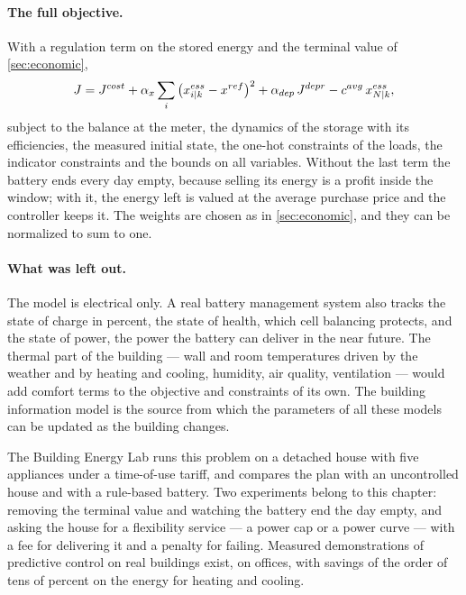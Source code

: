 \paragraph{The full objective.} With a regulation term on the stored energy and the terminal
value of \cref{sec:economic},
\begin{equation}
  J = J^{cost} + \alpha_x \sum_{i}\big(x^{ess}_{{i|k}} - x^{ref}\big)^2 + \alpha_{dep}\,J^{depr}
      - c^{avg}\,x^{ess}_{{N|k}} ,
\end{equation}
subject to the balance at the meter, the dynamics of the storage with its efficiencies, the
measured initial state, the one-hot constraints of the loads, the indicator constraints and the
bounds on all variables. Without the last term the battery ends every day empty, because selling
its energy is a profit inside the window; with it, the energy left is valued at the average
purchase price and the controller keeps it. The weights are chosen as in \cref{sec:economic},
and they can be normalized to sum to one.

\paragraph{What was left out.} The model is electrical only. A real battery management system
also tracks the state of charge in percent, the state of health, which cell balancing protects,
and the state of power, the power the battery can deliver in the near future. The thermal part
of the building --- wall and room temperatures driven by the weather and by heating and
cooling, humidity, air quality, ventilation --- would add comfort terms to the objective and
constraints of its own. The building information model is the source from which the parameters
of all these models can be updated as the building changes.

\begin{labbox}
The Building Energy Lab runs this problem on a detached house with five appliances under a
time-of-use tariff, and compares the plan with an uncontrolled house and with a rule-based
battery. Two experiments belong to this chapter: removing the terminal value and watching the
battery end the day empty, and asking the house for a flexibility service --- a power cap or a
power curve --- with a fee for delivering it and a penalty for failing. Measured
demonstrations of predictive control on real buildings exist, on offices, with savings of the
order of tens of percent on the energy for heating and cooling.
\end{labbox}

